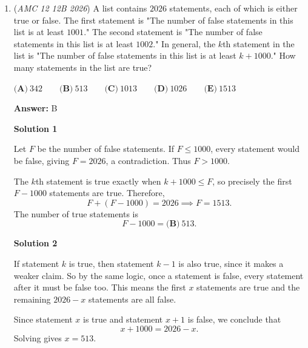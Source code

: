 \begin{enumerate}
 



\textbf{Solution 6 (Cartesian)}

Let $A=(-19,0),B=(19,0),D=-5,0)$.

 Then point C must satisfy $x^2+y^2=19^2$ (1) and $(x+5)^2+y^2=16^2$ (2).

 Subtracting (2) from (1) gives us $-10x-25=105$. Here $x=-13$.

 Then $y^2=19^2-13^2=192$, so $y=8\sqrt3$.

 The area is then 
 \[\frac{1}{2}(38)(8\sqrt{3})=152\sqrt{3}\]~BenjaminTonIsComingInThreeDays

 


	\item (\textit{AMC 12 12B 2026}) A list contains $2026$ statements, each of which is either true or false. The first statement is "The number of false statements in this list is at least $1001$." The second statement is "The number of false statements in this list is at least $1002$." In general, the $k$th statement in the list is "The number of false statements in this list is at least $k+1000$." How many statements in the list are true?


 $\textbf{(A)}\   342  \qquad                 \textbf{(B)}\   513  \qquad                 \textbf{(C)}\   1013  \qquad                 \textbf{(D)}\   1026  \qquad                 \textbf{(E)}\   1513$

 \textbf{Answer: }B



\textbf{Solution 1}

Let $F$ be the number of false statements. If $F\le1000$, every statement would be false, giving $F=2026$, a contradiction. Thus $F>1000$.

 The $k$th statement is true exactly when $k+1000\le F$, so precisely the first $F-1000$ statements are true. Therefore,
 \[F+(F-1000)=2026\implies F=1513.\]The number of true statements is
 \[F-1000=\boxed{\textbf{(B)}\ 513}.\]




\textbf{Solution 2}

If statement $k$ is true, then statement $k - 1$ is also true, since it makes a weaker claim. So by the same logic, once a statement is false, every statement after it must be false too. This means the first $x$ statements are true and the remaining $2026 - x$ statements are all false.

 Since statement $x$ is true and statement $x + 1$ is false, we conclude that
 \[x + 1000 = 2026 - x.\]Solving gives $x = \boxed{513}$.


\end{enumerate}
